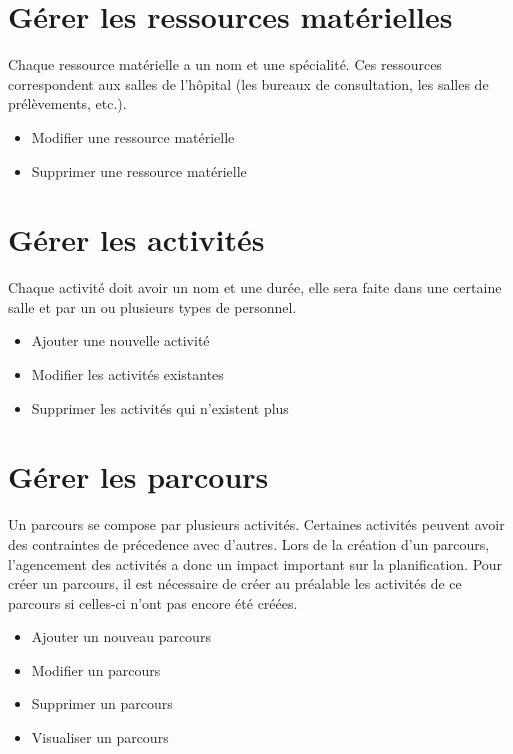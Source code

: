 \documentclass[noposter]{polytech/polytech}
\begin{document}
\section{Gérer les ressources matérielles}

Chaque ressource matérielle a un nom et une spécialité. Ces ressources correspondent aux salles de l'hôpital (les bureaux de consultation, les salles de prélèvements, etc.).

\begin{itemize}
	\item Modifier une ressource matérielle
	\item Supprimer une ressource matérielle 
\end{itemize}


\section{Gérer les activités}

Chaque activité doit avoir un nom et une durée, elle sera faite dans une certaine salle et par un ou plusieurs types de personnel.

\begin{itemize}
	\item Ajouter une nouvelle activité
	\item Modifier les activités existantes
	\item Supprimer les activités qui n'existent plus
\end{itemize}


\section{Gérer les parcours}

Un parcours se compose par plusieurs activités. Certaines activités peuvent avoir des contraintes de précedence avec d'autres. Lors de la création d'un parcours, l'agencement des activités a donc un impact important sur la planification. Pour créer un parcours, il est nécessaire de créer au préalable les activités de ce parcours si celles-ci n'ont pas encore été créées.

\begin{itemize}
	\item Ajouter un nouveau parcours
	\item Modifier un parcours
	\item Supprimer un parcours
	\item Visualiser un parcours
\end{itemize}
\end{document}
